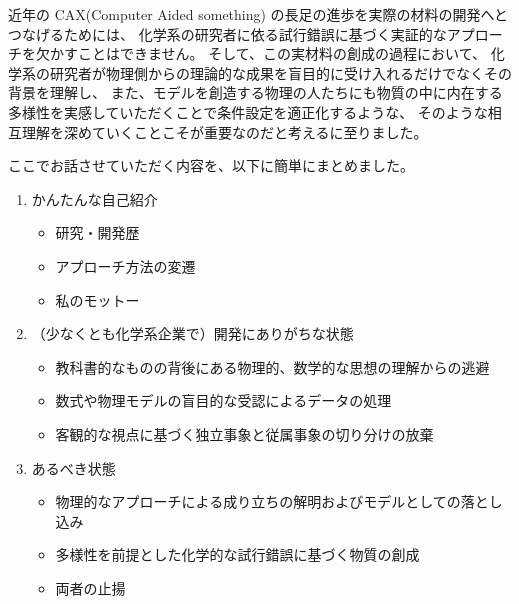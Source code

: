 \documentclass[uplatex,a4paper, 11pt]{jsarticle}
\begin{document}
近年の CAX(Computer Aided something) の長足の進歩を実際の材料の開発へとつなげるためには、
化学系の研究者に依る試行錯誤に基づく実証的なアプローチを欠かすことはできません。
そして、この実材料の創成の過程において、
化学系の研究者が物理側からの理論的な成果を盲目的に受け入れるだけでなくその背景を理解し、
また、モデルを創造する物理の人たちにも物質の中に内在する多様性を実感していただくことで条件設定を適正化するような、
そのような相互理解を深めていくことこそが重要なのだと考えるに至りました。
\vspace{3mm}
\begin{boxnote}
    ここでお話させていただく内容を、以下に簡単にまとめました。
\begin{enumerate}
    \item かんたんな自己紹介
    \begin{itemize}
        \item 研究・開発歴
        \item アプローチ方法の変遷
        \item 私のモットー
    \end{itemize}
    \item （少なくとも化学系企業で）開発にありがちな状態
    \begin{itemize}
        \item 教科書的なものの背後にある物理的、数学的な思想の理解からの逃避
        \item 数式や物理モデルの盲目的な受認によるデータの処理
        \item 客観的な視点に基づく独立事象と従属事象の切り分けの放棄
    \end{itemize}
    \item あるべき状態
    \begin{itemize}
        \item 物理的なアプローチによる成り立ちの解明およびモデルとしての落とし込み
        \item 多様性を前提とした化学的な試行錯誤に基づく物質の創成
        \item 両者の止揚
    \end{itemize}

\end{enumerate}
\end{boxnote}
\end{document}
